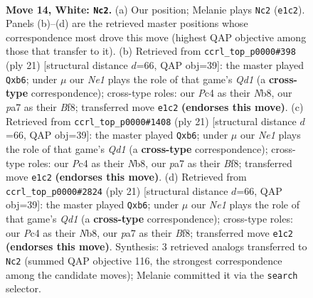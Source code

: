 \documentclass[11pt]{article}
\begin{document}
\clearpage

\begin{figure}[p]\centering
\begin{subfigure}{0.46\textwidth}\centering
\resizebox{\linewidth}{!}{%
\newchessgame
\chessboard[
  setfen={rnbq1rk1/pp3ppp/4pn2/2P5/2P5/3BP3/P4PPP/1RBQNRK1 w - - 5 14},
  showmover=false,
  pgfstyle=straightmove, color=movearrow, markmove={e1-c2}
]}
\caption{}
\end{subfigure}\hfill
\begin{subfigure}{0.46\textwidth}\centering
\resizebox{\linewidth}{!}{%
\newchessgame
\chessboard[
  setfen={rn1qkb1r/4pppp/pN6/2pb4/1p6/5N2/PPP2PPP/R1BQ1RK1 b kq - 1 11},
  showmover=false,
  pgfstyle=straightmove, color=movearrow, markmove={d8-b6}
]}
\caption{}
\end{subfigure}
\\[4pt]
\begin{subfigure}{0.46\textwidth}\centering
\resizebox{\linewidth}{!}{%
\newchessgame
\chessboard[
  setfen={rn1qkb1r/4pppp/pN6/2pb4/1p6/5N2/PPP2PPP/R1BQ1RK1 b kq - 1 11},
  showmover=false,
  pgfstyle=straightmove, color=movearrow, markmove={d8-b6}
]}
\caption{}
\end{subfigure}\hfill
\begin{subfigure}{0.46\textwidth}\centering
\resizebox{\linewidth}{!}{%
\newchessgame
\chessboard[
  setfen={rn1qkb1r/4pppp/pN6/2pb4/1p6/5N2/PPP2PPP/R1BQ1RK1 b kq - 1 11},
  showmover=false,
  pgfstyle=straightmove, color=movearrow, markmove={d8-b6}
]}
\caption{}
\end{subfigure}
\caption{\textbf{Move 14, White: \texttt{Nc2}.} (a) Our position; Melanie plays \texttt{Nc2} (\texttt{e1c2}). Panels (b)--(d) are the retrieved master positions whose correspondence most drove this move (highest QAP objective among those that transfer to it). (b) Retrieved from \texttt{ccrl\_top\_p0000\#398} (ply 21) [structural distance $d$=66, QAP obj=39]: the master played \texttt{Qxb6}; under $\mu$ our \emph{Ne1} plays the role of that game's \emph{Qd1} (a \textbf{cross-type} correspondence); cross-type roles: our \emph{P}c4 as their \emph{N}b8, our \emph{p}a7 as their \emph{B}f8; transferred move \texttt{e1c2} \textbf{(endorses this move)}. (c) Retrieved from \texttt{ccrl\_top\_p0000\#1408} (ply 21) [structural distance $d$=66, QAP obj=39]: the master played \texttt{Qxb6}; under $\mu$ our \emph{Ne1} plays the role of that game's \emph{Qd1} (a \textbf{cross-type} correspondence); cross-type roles: our \emph{P}c4 as their \emph{N}b8, our \emph{p}a7 as their \emph{B}f8; transferred move \texttt{e1c2} \textbf{(endorses this move)}. (d) Retrieved from \texttt{ccrl\_top\_p0000\#2824} (ply 21) [structural distance $d$=66, QAP obj=39]: the master played \texttt{Qxb6}; under $\mu$ our \emph{Ne1} plays the role of that game's \emph{Qd1} (a \textbf{cross-type} correspondence); cross-type roles: our \emph{P}c4 as their \emph{N}b8, our \emph{p}a7 as their \emph{B}f8; transferred move \texttt{e1c2} \textbf{(endorses this move)}. Synthesis: 3 retrieved analogs transferred to \texttt{Nc2} (summed QAP objective 116, the strongest correspondence among the candidate moves); Melanie committed it via the \texttt{search} selector.}
\label{fig:thought-m26}
\end{figure}
\end{document}
